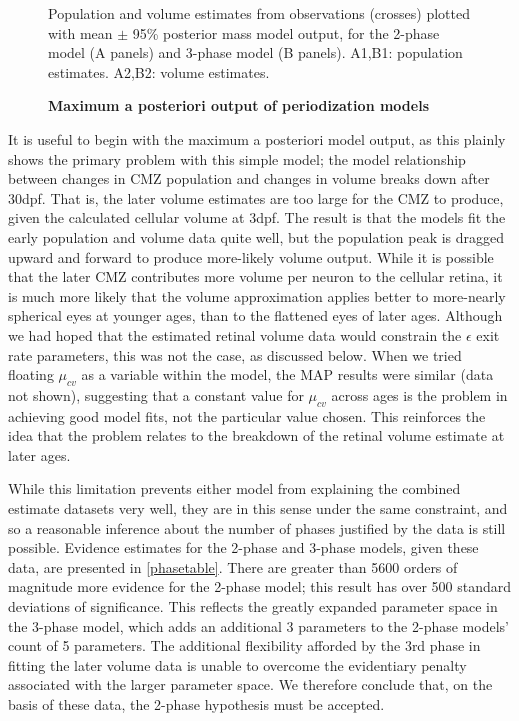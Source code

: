 \begin{figure}[!h]
    \caption{{\bf Maximum a posteriori output of periodization models}}
    \label{phaseMAPout}
    Population and volume estimates from observations (crosses) plotted with mean $\pm$ 95\% posterior mass model output, for the 2-phase model (A panels) and 3-phase model (B panels). A1,B1: population estimates. A2,B2: volume estimates.
\end{figure}

It is useful to begin with the maximum a posteriori model output, as this plainly shows the primary problem with this simple model; the model relationship between changes in CMZ population and changes in volume breaks down after 30dpf. That is, the later volume estimates are too large for the CMZ to produce, given the calculated cellular volume at 3dpf. The result is that the models fit the early population and volume data quite well, but the population peak is dragged upward and forward to produce more-likely volume output. While it is possible that the later CMZ contributes more volume per neuron to the cellular retina, it is much more likely that the volume approximation applies better to more-nearly spherical eyes at younger ages, than to the flattened eyes of later ages. Although we had hoped that the estimated retinal volume data would constrain the $\epsilon$ exit rate parameters, this was not the case, as discussed below. When we tried floating $\mu_{cv}$ as a variable within the model, the MAP results were similar (data not shown), suggesting that a constant value for $\mu_{cv}$ across ages is the problem in achieving good model fits, not the particular value chosen. This reinforces the idea that the problem relates to the breakdown of the retinal volume estimate at later ages.

While this limitation prevents either model from explaining the combined estimate datasets very well, they are in this sense under the same constraint, and so a reasonable inference about the number of phases justified by the data is still possible. Evidence estimates for the 2-phase and 3-phase models, given these data, are presented in \autoref{phasetable}. There are greater than 5600 orders of magnitude more evidence for the 2-phase model; this result has over 500 standard deviations of significance. This reflects the greatly expanded parameter space in the 3-phase model, which adds an additional 3 parameters to the 2-phase models' count of 5 parameters. The additional flexibility afforded by the 3rd phase in fitting the later volume data is unable to overcome the evidentiary penalty associated with the larger parameter space. We therefore conclude that, on the basis of these data, the 2-phase hypothesis must be accepted.

